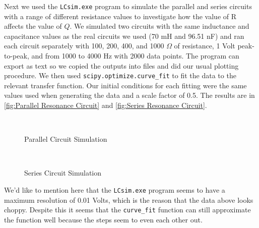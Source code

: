 \documentclass[12pt]{article}
\numberwithin{equation}{section}
\numberwithin{figure}{section}
\begin{document}
    Next we used the \texttt{LCsim.exe} program to simulate the parallel and series circuits with 
    a range of different resistance values to investigate how the value of R affects the value of $Q$. 
    We simulated two circuits with the same inductance and capacitance values as the real circuits we 
    used (70 mH and 96.51 nF) and ran each circuit separately with 100, 200, 400, and 1000 $\Omega$ 
    of resistance, 1 Volt peak-to-peak, and from 1000 to 4000 Hz with 2000 data points. The program 
    can export as text so we copied the outputs into  files and did our usual plotting 
    procedure. We then used \texttt{scipy.optimize.curve\_fit} to fit the data to the relevant 
    transfer function. Our initial conditions for each fitting were the same values used when 
    generating the data and a scale factor of 0.5.
    The results are in \autoref{fig:Parallel Resonance Circuit} and 
    \autoref{fig:Series Resonance Circuit}.
    \begin{figure}[H]%
        \centering
        \,
        \,
        \,
        \caption{Parallel Circuit Simulation}
        \label{fig:Parallel Simulation}
    \end{figure}
    \begin{figure}[H]%
        \centering
        \,
        \,
        \,
        \caption{Series Circuit Simulation}
        \label{fig:Series Simulation}
    \end{figure}
    We'd like to mention here that the \texttt{LCsim.exe} program seems to have a maximum resolution 
    of 0.01 Volts, which is the reason that the data above looks choppy. Despite this it seems that 
    the \texttt{curve\_fit} function can still approximate the function well because the steps seem 
    to even each other out. \newline \newline
\end{document}
